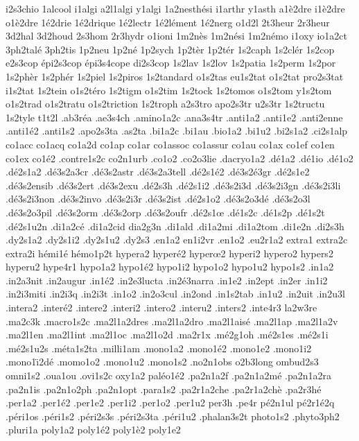 {i2s3chio
1alcool
i1algi
a2l1algi
y1algi
1a2nesth\'esi
i1arthr
y1asth
a1\`e2dre
i1\`e2dre
o1\`e2dre
1\'e2drie
1\'e2drique
1\'e2lectr
1\'e2l\'ement
1\'e2nerg
o1d2l
2t3heur
2r3heur
3d2hal
3d2houd
2s3hom
2r3hydr
o1ioni
1m2n\`es
1m2n\'esi
1m2n\'emo
i1oxy
io1a2ct
3ph2tal\'e
3ph2tis
1p2neu
1p2n\'e
1p2sych
1p2t\`er
1p2t\'er
1s2caph
1s2cl\'er
1s2cop
e2s3cop
\'epi2s3cop
\'epi3s4cope
di2s3cop
1s2lav
1s2lov
1s2patia
1s2perm
1s2por
1s2ph\`er
1s2ph\'er
1s2piel
1s2piros
1s2tandard
o1s2tas
eu1s2tat
o1s2tat
pro2s3tat
i1s2tat
1s2tein
o1s2t\'ero
1s2tigm
o1s2tim
1s2tock
1s2tomos
o1s2tom
y1s2tom
o1s2trad
o1s2tratu
o1s2triction
1s2troph
a2s3tro
apo2s3tr
u2s3tr
1s2tructu
1s2tyle
t1t2l
.ab3r\'ea
.ae3s4ch
.amino1a2c
.ana3s4tr
.anti1a2
.anti1e2
.anti2enne
.anti1\'e2
.anti1s2
.apo2s3ta
.as2ta
.bi1a2c
.bi1au
.bio1a2
.bi1u2
.bi2s1a2
.ci2s1alp
co1acc
co1acq
co1a2d
co1ap
co1ar
co1assoc
co1assur
co1au
co1ax
co1ef
co1en
co1ex
co1\'e2
.contre1s2c
co2n1urb
.co1o2
.co2o3lie
.dacryo1a2
.d\'e1a2
.d\'e1io
.d\'e1o2
.d\'e2s1a2
.d\'e3s2a3cr
.d\'e3s2astr
.d\'e3s2a3tell
.d\'e2s1\'e2
.d\'e3s2\'e3gr
.d\'e2s1e2
.d\'e3s2ensib
.d\'e3s2ert
.d\'e3s2exu
.d\'e2s3h
.d\'e2s1i2
.d\'e3s2i3d
.d\'e3s2i3gn
.d\'e3s2i3li
.d\'e3s2i3non
.d\'e3s2invo
.d\'e3s2i3r
.d\'e3s2ist
.d\'e2s1o2
.d\'e3s2o3d\'e
.d\'e3s2o3l
.d\'e3s2o3pil
.d\'e3s2orm
.d\'e3s2orp
.d\'e3s2oufr
.d\'e2s1\oe
.d\'e1s2c
.d\'e1s2p
.d\'e1s2t
.d\'e2s1u2n
.di1a2c\'e
.di1a2cid
dia2g3n
.di1ald
.di1a2mi
.di1a2tom
.di1e2n
.di2s3h
.dy2s1a2
.dy2s1i2
.dy2s1u2
.dy2s3
.en1a2
en1i2vr
.en1o2	
.eu2r1a2
extra1
extra2c
extra2i
h\'emi1\'e
h\'emo1p2t
hypera2
hyper\'e2
hyper\oe2
hyperi2
hypero2
hypers2
hyperu2
hype4r1
hypo1a2
hypo1\'e2
hypo1i2
hypo1o2
hypo1u2
hypo1s2
.in1a2
.in2a3nit
.in2augur
.in1\'e2
.in2e3lucta
.in2\'e3narra
.in1e2
.in2ept
.in2er
.in1i2
.in2i3miti
.in2i3q
.in2i3t
.in1o2
.in2o3cul
.in2ond
.in1s2tab
.in1u2
.in2uit
.in2u3l
.intera2
.inter\'e2
.intere2
.interi2
.intero2
.interu2
.inters2
.inte4r3
la2w3re
.ma2c3k
.macro1s2c
.ma2l1a2dres
.ma2l1a2dro
.ma2l1ais\'e
.ma2l1ap
.ma2l1a2v
.ma2l1en
.ma2l1int
.ma2l1oc
.ma2l1o2d
.ma2r1x
.m\'e2g1oh
.m\'e2s1es
.m\'e2s1i
.m\'e2s1u2s
.m\'eta1s2ta
.milli1am
.mono1a2
.mono1\'e2
.mono1e2
.mono1i2
.mono1\"\i2d\'e
.momo1o2
.mono1u2
.mono1s2
.no2n1obs
o2b3long
ombud2s3
omni1s2
.oua1ou
.ovi1s2c
oxy1a2
pal\'eo1\'e2
.pa2n1a2f
.pa2n1a2m\'e
.pa2n1a2ra
.pa2n1is
.pa2n1o2ph
.pa2n1opt
.para1s2
.pa2r1a2che
.pa2r1a2ch\`e
.pa2r3h\'e
.per1a2
.per1\'e2
.per1e2
.per1i2
.per1o2
.per1u2
per3h
.pe4r
p\'e2n1ul
p\'e2r1\'e2q
.p\'eri1os
.p\'eri1s2
.p\'eri2s3s
.p\'eri2s3ta
.p\'eri1u2
.phalan3s2t
photo1s2
.phyto3ph2
.pluri1a
poly1a2
poly1\'e2
poly1\`e2
poly1e2
}
